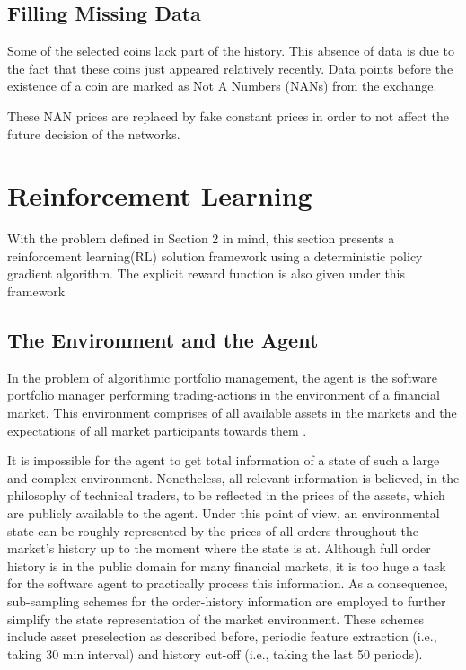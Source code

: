 \documentclass[journal,onecolumn]{IEEEtran}
\begin{document}
\subsection{Filling Missing Data}
Some of the selected coins lack part of the history. This absence of data is due to the fact that these coins just appeared relatively recently. Data points before the existence of a coin are marked as Not A Numbers (NANs) from the exchange.

These NAN prices are replaced by fake constant prices in order to not affect the future decision of the networks.

\section{Reinforcement Learning}
With the problem defined in Section 2 in mind, this section presents a reinforcement learning(RL) solution framework using a deterministic policy gradient algorithm. The explicit reward function is also given under this framework

\subsection{The Environment and the Agent}
In the problem of algorithmic portfolio management, the agent is the software portfolio manager performing trading-actions in the environment of a financial market. This environment comprises of all available assets in the markets and the expectations of all market participants towards them \cite{Jiang2017}.

It is impossible for the agent to get total information of a state of such a large and complex environment. Nonetheless, all relevant information is believed, in the philosophy
of technical traders\cite{Lo2000}, to be reflected in the prices of the assets, which are publicly available to the agent. Under this point of view, an environmental
state can be roughly represented by the prices of all orders throughout the market’s history up to the moment where the state is at. Although full order history is in the public domain for many financial markets, it is too huge a task for the software agent to practically process this information. As a consequence, sub-sampling schemes for the order-history information are employed to further simplify the state representation of the market environment. These
schemes include asset preselection as described before, periodic feature extraction (i.e., taking 30 min interval) and history cut-off (i.e., taking the last 50 periods).
\end{document}
